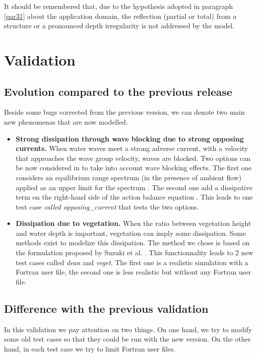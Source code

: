It should be remembered that, due to the hypothesis adopted in paragraph \ref{par31} about the \tomawac application domain, the reflection (partial or total) from a structure or a pronounced depth irregularity is not addressed by the model.

\chapter{Validation}
%
\section{Evolution compared to the previous release}
Beside some bugs corrected from the previous version, we can denote two main new phenomenas that are now modelled. 
\begin{itemize}
\item {\bf Strong dissipation through wave blocking due to strong opposing currents.} When water waves meet a strong adverse current, with a velocity that approaches the wave group velocity, waves are blocked. Two options can be now considered in \tomawac to take into account wave blocking effects. The first one considers an equilibrium range spectrum (in the presence of ambient flow) applied as an upper limit for the spectrum  \cite{Hedges1985}. The second one add a dissipative term on the right-hand side of the action balance equation \cite{Westhuys2012}. This leads to one test case {\it called opposing\_current} that tests the two options.  
\item {\bf Dissipation due to vegetation.} When the ratio between vegetation height and water depth is important, vegetation can imply some dissipation. Some methods exist  to modelize this dissipation. The method we chose is based on the formulation proposed by Suzuki et al. \cite{Suzuki2011}. This functionnality leads to 2 new test cases called {\it dean } and {\it veget}. The first one is a realistic simulation with a Fortran user file, the second one is less realistic but without any Fortran user file. 
\end {itemize} 
\section{Difference with the previous validation}
In this validation we pay attention on two things. On one hand, we try to modify some old test cases so that they could be run with the new version. On the other hand, in each test case we try to limit Fortran user files. 

